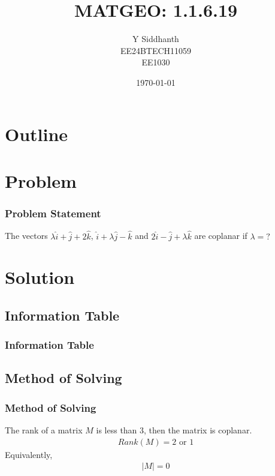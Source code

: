 \documentclass{beamer}
\title{MATGEO: 1.1.6.19}
\author{Y Siddhanth \\ EE24BTECH11059\\ EE1030}
\date{\today}
\providecommand{\brak}[1]{\ensuremath{\left(#1\right)}}
\theoremstyle{remark}
\providecommand{\abs}[1]{\left\vert#1\right\vert}
\numberwithin{equation}{section}
\begin{document}
\begin{frame}
\titlepage
\end{frame}

\section*{Outline}
\begin{frame}
\tableofcontents
\end{frame}
\section{Problem}
\begin{frame}
\frametitle{Problem Statement}
The vectors $\lambda\hat{i} + \hat{j} +2\hat{k}$, $\hat{i} + \lambda\hat{j} - \hat{k}$ and $2\hat{i} - \hat{j} +\lambda\hat{k}$  are coplanar if $\lambda = ?$
\end{frame}

\section{Solution}
\subsection{Information Table}
\begin{frame}
\frametitle{Information Table}
	\begin{table}[h!]    
		\centering
		
	\end{table}
\end{frame}
\subsection{Method of Solving}
\begin{frame}
	\frametitle{Method of Solving}
	The rank of a matrix $M$ is less than 3, then the matrix is coplanar. 
	\begin{align}
		Rank\brak{M} = 2 \text{ or } 1\label{eq1.1.6.19.1}
	\end{align}
	Equivalently,
	\begin{align}
		\abs{M} = 0 \label{eq1.1.6.19.2}
	\end{align}
\end{frame}
\end{document}
